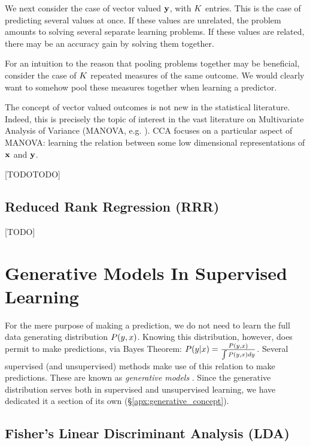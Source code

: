 We next consider the case of vector valued $\mathbf{y}$, with $K$ entries. 
This is the case of predicting several values at once.
If these values are unrelated, the problem amounts to solving several separate learning problems.
If these values are related, there may be an accuracy gain by solving them together.

For an intuition to the reason that pooling problems together may be beneficial, consider the case of $K$ repeated measures of the same outcome. We would clearly want to somehow pool these measures together when learning a predictor.

The concept of vector valued outcomes is not new in the statistical literature. 
Indeed, this is precisely the topic of interest in the vast literature on Multivariate Analysis of Variance (MANOVA, e.g. \cite{anderson_introduction_2003}).
CCA focuses on a particular aspect of MANOVA: learning the relation between some low dimensional representations of $\mathbf{x}$ and $\mathbf{y}$.


[TODOTODO]


\subsection{Reduced Rank Regression (RRR)}
\label{sec:reduced_rank_regression}
[TODO]




\section{Generative Models In Supervised Learning}
\label{sec:generative}

For the mere purpose of making a prediction, we do not need to learn the full data generating distribution $P(y,x)$. 
Knowing this distribution, however, does permit to make predictions, via Bayes Theorem: 
$P(y|x)=\frac{P(y,x)}{\int P(y,x)dy}$.
Several supervised (and unsupervised) methods make use of this relation to make predictions. These are known as \emph{generative models} .
Since the generative distribution serves both in supervised and unsupervised learning, we have dedicated it a section of its own (\S\ref{apx:generative_concept}).



\subsection{Fisher's Linear Discriminant Analysis (LDA)}
\label{sec:lda}


